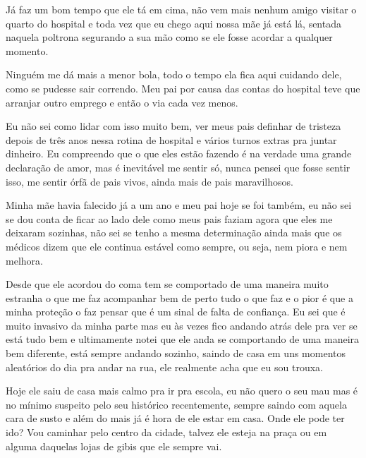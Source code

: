 Já faz um bom tempo que ele tá em cima, não vem mais nenhum amigo visitar o quarto do hospital e toda vez que eu chego aqui nossa mãe já está lá, sentada naquela poltrona segurando a sua mão como se ele fosse acordar a qualquer momento.

Ninguém me dá mais a menor bola, todo o tempo ela fica aqui cuidando dele, como se pudesse sair correndo. Meu pai por causa das contas do hospital teve que arranjar outro emprego e então o via cada vez menos.

Eu não sei como lidar com isso muito bem, ver meus pais definhar de tristeza depois de três anos nessa rotina de hospital e vários turnos extras pra juntar dinheiro. Eu compreendo que o que eles estão fazendo é na verdade uma grande declaração de amor, mas é inevitável me sentir só, nunca pensei que fosse sentir isso, me sentir órfã de pais vivos, ainda mais de pais maravilhosos.


Minha mãe havia falecido já a um ano e meu pai hoje se foi também, eu não sei se dou conta de ficar ao lado dele como meus pais faziam agora que eles me deixaram sozinhas, não sei se tenho a mesma determinação ainda mais que os médicos dizem que ele continua estável como sempre, ou seja, nem piora e nem melhora.


Desde que ele acordou do coma tem se comportado de uma maneira muito estranha o que me faz acompanhar bem de perto tudo o que faz e o pior é que a minha proteção o faz pensar que é um sinal de falta de confiança. Eu sei que é muito invasivo da minha parte mas eu às vezes fico andando atrás dele pra ver se está tudo bem e ultimamente notei que ele anda se comportando de uma maneira bem diferente, está sempre andando sozinho, saindo de casa em uns momentos aleatórios do dia pra andar na rua, ele realmente acha que eu sou trouxa.


Hoje ele saiu de casa mais calmo pra ir pra escola, eu não quero o seu mau mas é no mínimo suspeito pelo seu histórico recentemente, sempre saindo com aquela cara de susto e além do mais já é hora de ele estar em casa.
Onde ele pode ter ido? Vou caminhar pelo centro da cidade, talvez ele esteja na praça ou em alguma daquelas lojas de gibis que ele sempre vai.


